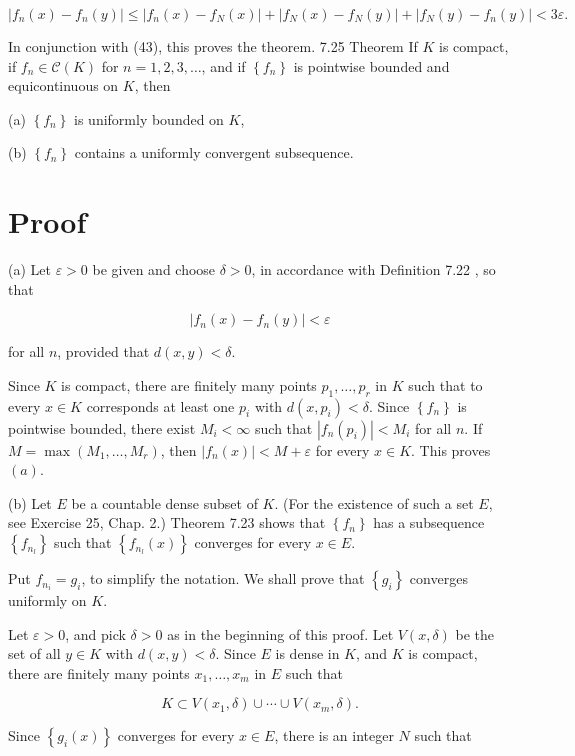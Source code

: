 \documentclass[10pt]{article}
\begin{document}
$$
\left|f_{n}(x)-f_{n}(y)\right| \leq\left|f_{n}(x)-f_{N}(x)\right|+\left|f_{N}(x)-f_{N}(y)\right|+\left|f_{N}(y)-f_{n}(y)\right|<3 \varepsilon \text {. }
$$

In conjunction with (43), this proves the theorem. 7.25 Theorem If $K$ is compact, if $f_{n} \in \mathscr{C}(K)$ for $n=1,2,3, \ldots$, and if $\left\{f_{n}\right\}$ is pointwise bounded and equicontinuous on $K$, then

(a) $\left\{f_{n}\right\}$ is uniformly bounded on $K$,

(b) $\left\{f_{n}\right\}$ contains a uniformly convergent subsequence.

\section{Proof}
(a) Let $\varepsilon>0$ be given and choose $\delta>0$, in accordance with Definition 7.22 , so that

$$
\left|f_{n}(x)-f_{n}(y)\right|<\varepsilon
$$

for all $n$, provided that $d(x, y)<\delta$.

Since $K$ is compact, there are finitely many points $p_{1}, \ldots, p_{r}$ in $K$ such that to every $x \in K$ corresponds at least one $p_{i}$ with $d\left(x, p_{i}\right)<\delta$. Since $\left\{f_{n}\right\}$ is pointwise bounded, there exist $M_{i}<\infty$ such that $\left|f_{n}\left(p_{i}\right)\right|<M_{i}$ for all $n$. If $M=\max \left(M_{1}, \ldots, M_{r}\right)$, then $\left|f_{n}(x)\right|<M+\varepsilon$ for every $x \in K$. This proves $(a)$.

(b) Let $E$ be a countable dense subset of $K$. (For the existence of such a set $E$, see Exercise 25, Chap. 2.) Theorem 7.23 shows that $\left\{f_{n}\right\}$ has a subsequence $\left\{f_{n_{l}}\right\}$ such that $\left\{f_{n_{l}}(x)\right\}$ converges for every $x \in E$.

Put $f_{n_{i}}=g_{i}$, to simplify the notation. We shall prove that $\left\{g_{i}\right\}$ converges uniformly on $K$.

Let $\varepsilon>0$, and pick $\delta>0$ as in the beginning of this proof. Let $V(x, \delta)$ be the set of all $y \in K$ with $d(x, y)<\delta$. Since $E$ is dense in $K$, and $K$ is compact, there are finitely many points $x_{1}, \ldots, x_{m}$ in $E$ such that

$$
K \subset V\left(x_{1}, \delta\right) \cup \cdots \cup V\left(x_{m}, \delta\right) .
$$

Since $\left\{g_{i}(x)\right\}$ converges for every $x \in E$, there is an integer $N$ such that
\end{document}
